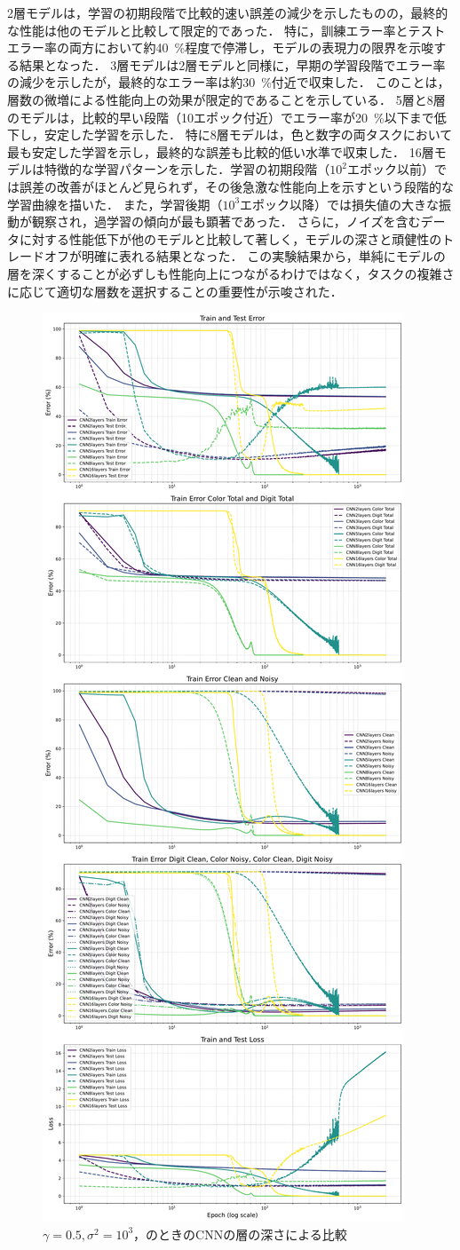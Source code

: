 2層モデルは，学習の初期段階で比較的速い誤差の減少を示したものの，最終的な性能は他のモデルと比較して限定的であった．
特に，訓練エラー率とテストエラー率の両方において約\SI{40}{\percent}程度で停滞し，モデルの表現力の限界を示唆する結果となった．
3層モデルは2層モデルと同様に，早期の学習段階でエラー率の減少を示したが，最終的なエラー率は約\SI{30}{\percent}付近で収束した．
このことは，層数の微増による性能向上の効果が限定的であることを示している．
5層と8層のモデルは，比較的早い段階（10エポック付近）でエラー率が\SI{20}{\percent}以下まで低下し，安定した学習を示した．
特に8層モデルは，色と数字の両タスクにおいて最も安定した学習を示し，最終的な誤差も比較的低い水準で収束した．
16層モデルは特徴的な学習パターンを示した．学習の初期段階（$10^2$エポック以前）では誤差の改善がほとんど見られず，その後急激な性能向上を示すという段階的な学習曲線を描いた．
また，学習後期（$10^3$エポック以降）では損失値の大きな振動が観察され，過学習の傾向が最も顕著であった．
さらに，ノイズを含むデータに対する性能低下が他のモデルと比較して著しく，モデルの深さと頑健性のトレードオフが明確に表れる結果となった．
この実験結果から，単純にモデルの層を深くすることが必ずしも性能向上につながるわけではなく，タスクの複雑さに応じて適切な層数を選択することの重要性が示唆された．

\begin{figure}[H]
    \centering
    \includegraphics[width=0.4\linewidth]{fig/layer_comparison/cnn_layers_comparison.pdf}
    \caption{$\gamma = 0.5, \sigma^2 = 10^3$，のときのCNNの層の深さによる比較}
    \label{fig:cnn_layers_comparison}
\end{figure}

